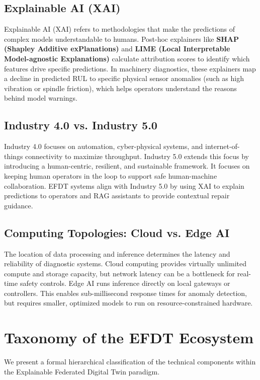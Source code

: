 \documentclass[journal,10pt,compsoc]{IEEEtran}
\begin{document}
\subsection{Explainable AI (XAI)}
Explainable AI (XAI) refers to methodologies that make the predictions of complex models understandable to humans. Post-hoc explainers like \textbf{SHAP (Shapley Additive exPlanations)} and \textbf{LIME (Local Interpretable Model-agnostic Explanations)} calculate attribution scores to identify which features drive specific predictions. In machinery diagnostics, these explainers map a decline in predicted RUL to specific physical sensor anomalies (such as high vibration or spindle friction), which helps operators understand the reasons behind model warnings.

\subsection{Industry 4.0 vs. Industry 5.0}
Industry 4.0 focuses on automation, cyber-physical systems, and internet-of-things connectivity to maximize throughput. Industry 5.0 extends this focus by introducing a human-centric, resilient, and sustainable framework. It focuses on keeping human operators in the loop to support safe human-machine collaboration. EFDT systems align with Industry 5.0 by using XAI to explain predictions to operators and RAG assistants to provide contextual repair guidance.

\subsection{Computing Topologies: Cloud vs. Edge AI}
The location of data processing and inference determines the latency and reliability of diagnostic systems. Cloud computing provides virtually unlimited compute and storage capacity, but network latency can be a bottleneck for real-time safety controls. Edge AI runs inference directly on local gateways or controllers. This enables sub-millisecond response times for anomaly detection, but requires smaller, optimized models to run on resource-constrained hardware.

\section{Taxonomy of the EFDT Ecosystem}
\label{sec:taxonomy}

We present a formal hierarchical classification of the technical components within the Explainable Federated Digital Twin paradigm.
\end{document}
